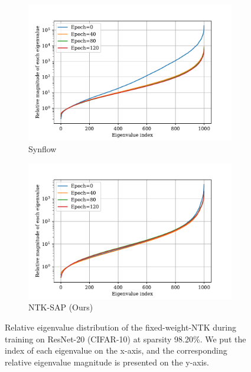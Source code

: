 \documentclass{article} %
\begin{document}
\begin{figure}
\begin{subfigure}[b]{.49\textwidth}
  \end{subfigure}
    \begin{subfigure}[b]{.49\textwidth}
        \includegraphics[width=\textwidth]{plots/nips_rebuttal/during/synflow.pdf}
   \caption{\small Synflow}

    \end{subfigure}
    \begin{subfigure}[b]{.49\textwidth}
    \includegraphics[width=\textwidth]{plots/nips_rebuttal/during/NTKSAP.pdf}
   \caption{\small NTK-SAP (Ours)}

    \end{subfigure}
    \caption{Relative eigenvalue distribution of the fixed-weight-NTK during training on ResNet-20 (CIFAR-10) at sparsity 98.20\%. We put the index of each eigenvalue on the x-axis, and the corresponding relative eigenvalue magnitude is presented on the y-axis.
    }
    \label{fig:appendix-eig-during}
\end{figure}
\end{document}
